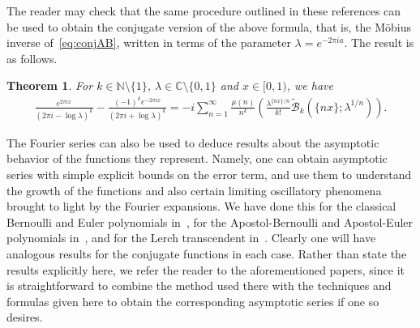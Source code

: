 \documentclass[11pt,a4paper,reqno]{amsart}
\newcommand{\B}{\mathcal{B}}
\newcommand{\C}{\mathbb{C}}
\newcommand{\N}{\mathbb{N}}
\let\tilde\widetilde
\theoremstyle{plain}
\newtheorem{theorem}{Theorem}%
\theoremstyle{remark}
\numberwithin{equation}{section}
\begin{document}
The reader may check that the same procedure outlined in these references can be used to obtain the conjugate version of the above formula, that is, the M\"obius inverse of~\eqref{eq:conjAB}, written in terms of the parameter $\lambda = e^{-2\pi i a}$. The result is as follows.

\begin{theorem}
\label{th:mobiusconjB}
For $k\in \N \setminus\{1\}$, $\lambda \in \C \setminus \{0,1\}$ and $x \in [0,1)$, we have
\begin{multline*}
  \frac{e^{2 \pi i x}}{(2 \pi i - \log \lambda)^k}
    - \frac{(-1)^k e^{-2 \pi i x}}{(2 \pi i + \log \lambda)^k}
  = - i \sum_{n=1}^{\infty} \frac{\mu(n)}{n^{k}}
    \left(
    \frac{\lambda^{\{nx\}/n}}{k!} \tilde{\B}_{k}(\{nx\};\lambda^{1/n})
    \right).
\end{multline*}
\end{theorem}

The Fourier series can also be used to deduce results about the asymptotic behavior of the functions they represent. Namely, one can obtain asymptotic series with simple explicit bounds on the error term, and use them to understand the growth of the functions and also certain limiting oscillatory phenomena brought to light by the Fourier expansions. We have done this for the classical Bernoulli and Euler polynomials in~\cite{NRV-JAT}, for the Apostol-Bernoulli and Apostol-Euler polynomials in~\cite{NRV-MC}, and for the Lerch transcendent in~\cite{NRV-JAT2}. Clearly one will have analogous results for the conjugate functions in each case. Rather than state the results explicitly here, we refer the reader to the aforementioned papers, since it is straightforward to combine the method used there with the techniques and formulas given here to obtain the corresponding asymptotic series if one so desires.
\end{document}
